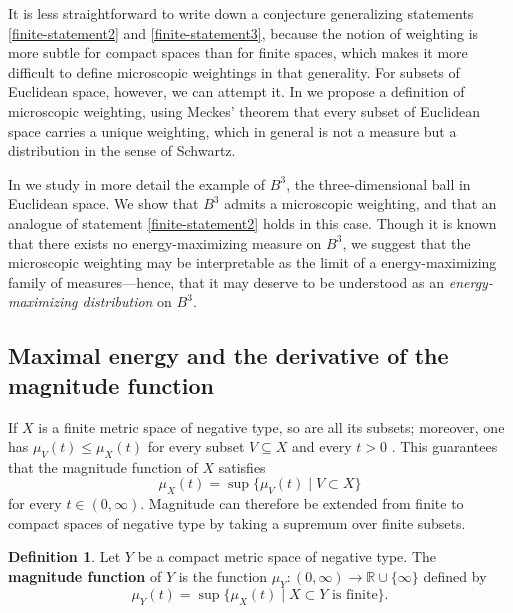 \documentclass[a4paper, oneside, reqno]{amsart}
\theoremstyle{definition}
\newtheorem{definition}[theorem]{Definition}
\theoremstyle{remark}
\numberwithin{equation}{section}
\newcommand{\R}{\mathbb{R}}
\newcommand{\define}{\textbf}
\begin{document}
It is less straightforward to write down a conjecture generalizing statements \eqref{finite-statement2} and \eqref{finite-statement3}, because the notion of weighting is more subtle for compact spaces than for finite spaces, which makes it more difficult to define microscopic weightings in that generality. For subsets of Euclidean space, however, we can attempt it. In  we propose a definition of microscopic weighting, using Meckes' theorem that every subset of Euclidean space carries a unique weighting, which in general is not a measure but a {distribution} in the sense of Schwartz.

In  we study in more detail the example of \(B^3\), the three-dimensional ball in Euclidean space. We show that \(B^3\) admits a microscopic weighting, and that an analogue of statement \eqref{finite-statement2} holds in this case. Though it is known that there exists no energy-maximizing measure on \(B^3\), we suggest that the microscopic weighting may be interpretable as the limit of a energy-maximizing family of measures---hence, that it may deserve to be understood as an \emph{energy-maximizing distribution} on \(B^3\).


\subsection{Maximal energy and the derivative of the magnitude function}
\label{subsec:max-energy-derivative-infinite}

If \(X\) is a finite metric space of negative type, so are all its subsets; moreover, one has \(\mu_V(t) \leq \mu_X(t)\) for every subset \(V \subseteq X\) and every \(t > 0\) \cite[Corollary~2.4.4]{LeinsterMagnitude2013}. This guarantees that the magnitude function of \(X\) satisfies
\[\mu_X(t) = \sup\{\mu_V(t) \mid V \subset X\}\]
for every \(t \in (0, \infty)\). Magnitude can therefore be extended from finite to compact spaces of negative type by taking a supremum over finite subsets.

\begin{definition}
\label{def:mag-infinite}
Let \(Y\) be a compact metric space of negative type.
The \define{magnitude function} of \(Y\) is the function \(\mu_Y \colon (0, \infty) \to \R \cup \{\infty\}\) defined by
\[\mu_Y(t) = \sup \{\mu_X(t) \mid X \subset Y \text{ is finite}\}.\]
\end{definition}
\end{document}
